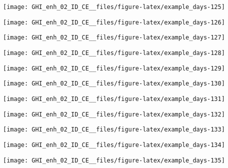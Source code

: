 \documentclass[
  10pt,
  a4paper,oneside]{article}
\begin{document}
\begin{center}\texttt{[image: GHI\_enh\_02\_ID\_CE\_\_files/figure-latex/example\_days-125]} \end{center}

\begin{center}\texttt{[image: GHI\_enh\_02\_ID\_CE\_\_files/figure-latex/example\_days-126]} \end{center}

\begin{center}\texttt{[image: GHI\_enh\_02\_ID\_CE\_\_files/figure-latex/example\_days-127]} \end{center}

\begin{center}\texttt{[image: GHI\_enh\_02\_ID\_CE\_\_files/figure-latex/example\_days-128]} \end{center}

\begin{center}\texttt{[image: GHI\_enh\_02\_ID\_CE\_\_files/figure-latex/example\_days-129]} \end{center}

\begin{center}\texttt{[image: GHI\_enh\_02\_ID\_CE\_\_files/figure-latex/example\_days-130]} \end{center}

\begin{center}\texttt{[image: GHI\_enh\_02\_ID\_CE\_\_files/figure-latex/example\_days-131]} \end{center}

\begin{center}\texttt{[image: GHI\_enh\_02\_ID\_CE\_\_files/figure-latex/example\_days-132]} \end{center}

\begin{center}\texttt{[image: GHI\_enh\_02\_ID\_CE\_\_files/figure-latex/example\_days-133]} \end{center}

\begin{center}\texttt{[image: GHI\_enh\_02\_ID\_CE\_\_files/figure-latex/example\_days-134]} \end{center}

\begin{center}\texttt{[image: GHI\_enh\_02\_ID\_CE\_\_files/figure-latex/example\_days-135]} \end{center}
\end{document}
